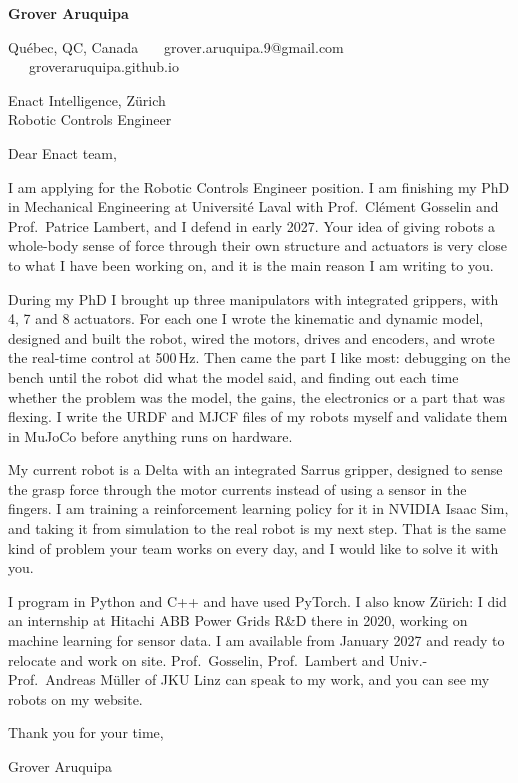 \documentclass[11pt,a4paper]{article}
\begin{document}
{\large\bfseries Grover Aruquipa}\par\vspace{-6pt}
{\small Qu\'ebec, QC, Canada \ \textbullet\ \ grover.aruquipa.9@gmail.com \ \textbullet\ \ groveraruquipa.github.io}

\vspace{4pt}
Enact Intelligence, Z\"urich\\
Robotic Controls Engineer

Dear Enact team,

I am applying for the Robotic Controls Engineer position. I am finishing my PhD in Mechanical Engineering at Universit\'e Laval with Prof.\ Cl\'ement Gosselin and Prof.\ Patrice Lambert, and I defend in early 2027. Your idea of giving robots a whole-body sense of force through their own structure and actuators is very close to what I have been working on, and it is the main reason I am writing to you.

During my PhD I brought up three manipulators with integrated grippers, with 4, 7 and 8 actuators. For each one I wrote the kinematic and dynamic model, designed and built the robot, wired the motors, drives and encoders, and wrote the real-time control at 500\,Hz. Then came the part I like most: debugging on the bench until the robot did what the model said, and finding out each time whether the problem was the model, the gains, the electronics or a part that was flexing. I write the URDF and MJCF files of my robots myself and validate them in MuJoCo before anything runs on hardware.

My current robot is a Delta with an integrated Sarrus gripper, designed to sense the grasp force through the motor currents instead of using a sensor in the fingers. I am training a reinforcement learning policy for it in NVIDIA Isaac Sim, and taking it from simulation to the real robot is my next step. That is the same kind of problem your team works on every day, and I would like to solve it with you.

I program in Python and C++ and have used PyTorch. I also know Z\"urich: I did an internship at Hitachi ABB Power Grids R\&D there in 2020, working on machine learning for sensor data. I am available from January 2027 and ready to relocate and work on site. Prof.\ Gosselin, Prof.\ Lambert and Univ.-Prof.\ Andreas M\"uller of JKU Linz can speak to my work, and you can see my robots on my website.

Thank you for your time,

Grover Aruquipa
\end{document}
